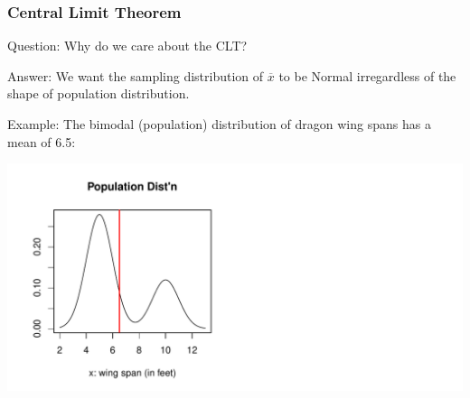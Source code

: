 \documentclass[handout]{beamer}
\newcommand{\blue}[1]{\textcolor{blue2}{#1}}
\newcommand{\xbar}{\overline{x}}
\begin{document}
\begin{frame}
\frametitle{Central Limit Theorem}
\blue{Question}:  Why do we care about the CLT?

\vspace{0.25cm}

\pause\blue{Answer}:  We want the sampling distribution of $\xbar$ to be Normal \blue{irregardless} of the shape of population distribution.

\vspace{0.25cm}

\pause\blue{Example}:  The bimodal (population) distribution of dragon wing spans has a mean of 6.5:

\pause\begin{center}
\includegraphics[width=\textwidth]{figure/CLT1.pdf}
\end{center}

\end{frame}
\end{document}
